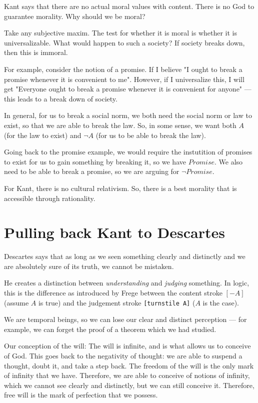 \documentclass[11pt]{book}
\begin{document}
Kant says that there are no actual moral values with content.
There is no God to guarantee morality.
Why should we be moral?

Take any subjective maxim. The test for whether it is moral is whether
it is universalizable. What would happen to such a society? If society
breaks down, then this is immoral.

For example, consider the notion of a promise. If I believe "I ought
to break a promise whenever it is convenient to me". However, if I
universalize this, I will get "Everyone ought to break a promise
whenever it is convenient for anyone" --- this leads to a break down
of society.

In general, for us to break a social norm, we both need the social norm
or law to exist, so that we are able to break the law. So, in some sense,
we want both $A$ (for the law to exist) and ${\lnot A}$
(for us to be able to break the law).

Going back to the promise example, we would require the instutition of promises
to exist for us to gain something by breaking it, so we have $Promise$. We also need
to be able to break a promise, so we are arguing for $\lnot Promise$.

For Kant, there is no cultural relativism. So, there is a best morality that is
accessible through rationality.

\section{Pulling back Kant to Descartes}

Descartes says that as long as we seen something clearly and distinctly and we
are absolutely sure of its truth, we cannot be mistaken. 

He creates a distinction between \emph{understanding} and \emph{judging}
something. In logic, this is the difference as introduced by Frege between the
content stroke $[- A]$(assume $A$ is true) and  the judgement stroke \texttt{[turnstile A]}
($A$ is the case).

We are temporal beings, so we can lose our clear and distinct perception --- for example,
we can forget the proof of a theorem which we had studied.

Our conception of the will: The will is infinite, and is what allows us to conceive of God.
This goes back to the negativity of thought: we are able to suspend a thought,
doubt it, and take a step back. The freedom of the will is the only mark of infinity
that we have. Therefore, we are able to conceive of notions of infinity, which we cannot
see clearly and distinctly, but we can still conceive it. Therefore, free will is
the mark of perfection that we possess. 
\end{document}

